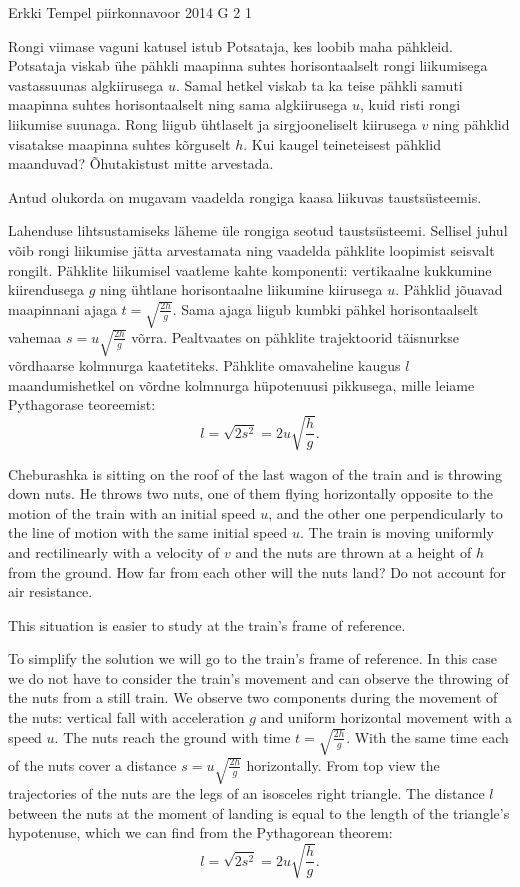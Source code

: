 {Erkki Tempel} %
{piirkonnavoor} %
{2014} %
{G 2} %
{1} %
{
\ifStatement
Rongi viimase vaguni katusel istub Potsataja, kes loobib maha pähkleid. Potsataja viskab ühe pähkli maapinna suhtes horisontaalselt rongi liikumisega vastassuunas algkiirusega $u$. Samal hetkel viskab ta ka teise pähkli samuti maapinna suhtes horisontaalselt ning sama algkiirusega $u$, kuid risti rongi liikumise suunaga. Rong liigub ühtlaselt ja sirgjooneliselt kiirusega $v$ ning pähklid visatakse maapinna suhtes kõrguselt $h$. Kui kaugel teineteisest pähklid maanduvad? Õhutakistust mitte arvestada.
\fi


\ifHint
Antud olukorda on mugavam vaadelda rongiga kaasa liikuvas taustsüsteemis.
\fi


\ifSolution
Lahenduse lihtsustamiseks läheme üle rongiga seotud taustsüsteemi. Sellisel juhul võib rongi liikumise jätta arvestamata ning vaadelda pähklite loopimist seisvalt rongilt. Pähklite liikumisel vaatleme kahte komponenti: vertikaalne kukkumine kiirendusega $g$ ning ühtlane horisontaalne liikumine kiirusega $u$. Pähklid jõuavad maapinnani ajaga 
$t=\sqrt{\frac{2h}{g}}$.
Sama ajaga liigub kumbki pähkel horisontaalselt vahemaa $s=u\sqrt{\frac{2h}{g}}$ võrra. Pealtvaates on pähklite trajektoorid täisnurkse võrdhaarse kolmnurga kaatetiteks. Pähklite omavaheline kaugus $l$ maandumishetkel on võrdne kolmnurga hüpotenuusi pikkusega, mille leiame Pythagorase teoreemist:
\[ l=\sqrt{2s^2}=2u\sqrt{\frac{h}{g}}. \]
\fi


\ifEngStatement
Cheburashka is sitting on the roof of the last wagon of the train and is throwing down nuts. He throws two nuts, one of them flying horizontally opposite to the motion of the train with an initial speed $u$, and the other one perpendicularly to the line of motion with the same initial speed $u$. The train is moving uniformly and rectilinearly with a velocity of $v$ and the nuts are thrown at a height of $h$ from the ground. How far from each other will the nuts land? Do not account for air resistance.
\fi


\ifEngHint
This situation is easier to study at the train’s frame of reference.
\fi


\ifEngSolution
To simplify the solution we will go to the train’s frame of reference. In this case we do not have to consider the train’s movement and can observe the throwing of the nuts from a still train. We observe two components during the movement of the nuts: vertical fall with acceleration $g$ and uniform horizontal movement with a speed $u$. The nuts reach the ground with time $t=\sqrt{\frac{2h}{g}}$. With the same time each of the nuts cover a distance $s=u\sqrt{\frac{2h}{g}}$ horizontally. From top view the trajectories of the nuts are the legs of an isosceles right triangle. The distance $l$ between the nuts at the moment of landing is equal to the length of the triangle’s hypotenuse, which we can find from the Pythagorean theorem: 
\[ l=\sqrt{2s^2}=2u\sqrt{\frac{h}{g}}. \]
\fi
}